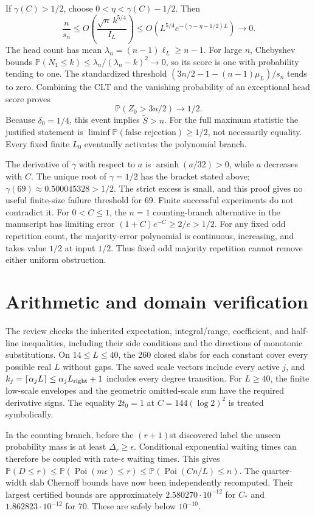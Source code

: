 \documentclass[10pt]{article}
\newcommand{\Prb}{\mathbb P}
\begin{document}
If $\gamma(C)>1/2$, choose $0<\eta<\gamma(C)-1/2$. Then
\[
\frac n{s_n}\le O\left(\frac{\sqrt n\,k^{5/4}}{I_L}\right)
\le O\left(L^{5/4}e^{-(\gamma-\eta-1/2)L}\right)\to0.
\]
The head count has mean $\lambda_n=(n-1)\ell_L\ge n-1$.
For large $n$, Chebyshev bounds
$\Prb(N_1\le k)\le\lambda_n/(\lambda_n-k)^2\to0$,
so its score is one with probability tending to one.
The standardized threshold
$(3n/2-1-(n-1)\mu_L)/s_n$ tends to zero. Combining the CLT and the
vanishing probability of an exceptional head score proves
\[
\Prb(Z_0>3n/2)\to1/2.
\]
Because $\delta_0=1/4$, this event implies $\widetilde S>n$.
For the full maximum statistic the justified statement is
$\liminf\Prb(\text{false rejection})\ge1/2$, not necessarily equality.
Every fixed finite $L_0$ eventually activates the polynomial branch.

The derivative of $\gamma$ with respect to $a$ is
$\operatorname{arsinh}(a/32)>0$, while $a$ decreases with $C$.
The unique root of $\gamma=1/2$ has the bracket stated above;
$\gamma(69)\approx0.500045328>1/2$.
The strict excess is small, and this proof gives no useful finite-size
failure threshold for 69. Finite successful experiments do not contradict it.
For $0<C\le1$, the $n=1$ counting-branch alternative in the manuscript
has limiting error $(1+C)e^{-C}\ge2/e>1/2$.
For any fixed odd repetition count, the majority-error polynomial is
continuous, increasing, and takes value $1/2$ at input $1/2$.
Thus fixed odd majority repetition cannot remove either uniform obstruction.

\section{Arithmetic and domain verification}
The review checks the inherited expectation, integral/range, coefficient,
and half-line inequalities, including their side conditions and the
directions of monotonic substitutions. On $14\le L\le40$, the 260
closed slabs for each constant cover every possible real $L$ without gaps.
The saved scale vectors include every active $j$, and
$k_j=\lceil\alpha_jL\rceil\le\alpha_jL_{\rm right}+1$ includes every
degree transition. For $L\ge40$, the finite low-scale envelopes and the
geometric omitted-scale sum have the required derivative signs. The
equality $2t_0=1$ at $C=144(\log2)^2$ is treated symbolically.

In the counting branch, before the $(r+1)$st discovered label the unseen
probability mass is at least $\Delta_r\ge\epsilon$. Conditional exponential
waiting times can therefore be coupled with rate-$\epsilon$ waiting times.
This gives
$\Prb(D\le r)\le\Prb(\operatorname{Poi}(m\epsilon)\le r)
\le\Prb(\operatorname{Poi}(Cn/L)\le n)$.
The quarter-width slab Chernoff bounds have now been independently
recomputed. Their largest certified bounds are approximately
$2.580270\cdot10^{-12}$ for $C_*$ and $1.862823\cdot10^{-12}$ for 70.
These are safely below $10^{-10}$.
\end{document}
